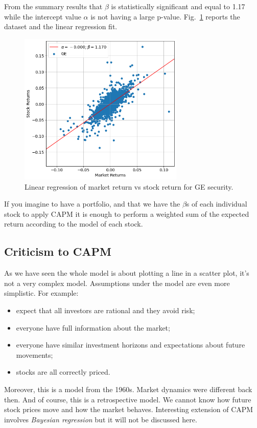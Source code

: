 From the summary results that $\beta$ is statistically significant and equal to 1.17 while the intercept value $\alpha$ is not having a large p-value. Fig.~\ref{fig:capm_fit} reports the dataset and the linear regression fit.

\begin{figure}[htbp]
\centering
\includegraphics[width=0.7\textwidth]{figures/capm_fit}
\caption{Linear regression of market return vs stock return for GE security.}
\label{fig:capm_fit}
\end{figure}

If you imagine to have a portfolio, and that we have the $\beta$s of each individual stock to apply CAPM it is enough to perform a weighted sum of the expected return according to the model of each stock.

\subsection{Criticism to CAPM}
As we have seen the whole model is about plotting a line in a scatter plot, it’s not a very complex model. Assumptions under the model are even more simplistic. For example:
\begin{itemize}
\tightlist
\item expect that all investors are rational and they avoid risk;
\item everyone have full information about the market;
\item everyone have similar investment horizons and expectations about future movements;
\item stocks are all correctly priced.
\end{itemize}

Moreover, this is a model from the 1960s. Market dynamics were different back then. And of course, this is a retrospective model. We cannot know how future stock prices move and how the market behaves.
Interesting extension of CAPM involves \emph{Bayesian regression}\cite{bib:bayesian_regression} but it will not be discussed here.

